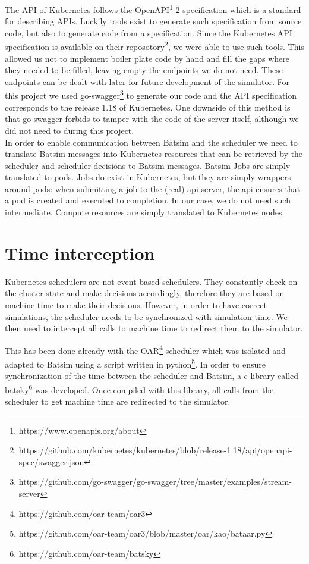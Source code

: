The API of Kubernetes follows the
OpenAPI\footnote{https://www.openapis.org/about} 2 specification which is a
standard for describing APIs. Luckily tools exist to generate such
specification from source code, but also to generate code from a specification.
Since the Kubernetes API specification is available on their
reposotory\footnote{https://github.com/kubernetes/kubernetes/blob/release-1.18/api/openapi-spec/swagger.json},
we were able to use such tools. This allowed us not to implement boiler plate
code by hand and fill the gaps where they needed to be filled, leaving empty
the endpoints we do not need. These endpoints can be dealt with later for
future development of the simulator. For this project we used
go-swagger\footnote{https://github.com/go-swagger/go-swagger/tree/master/examples/stream-server}
to generate our code and the API specification corresponds to the release 1.18
of Kubernetes. One downside of this method is that go-swagger forbids to tamper
with the code of the server itself, although we did not need to during this
project.\\

In order to enable communication between Batsim and the scheduler we need to
translate Batsim messages into Kubernetes resources that can be retrieved by
the scheduler and scheduler decisions to Batsim messages. Batsim Jobs are
simply translated to pods. Jobs do exist in Kubernetes, but they are simply
wrappers around pods: when submitting a job to the (real) api-server, the api
ensures that a pod is created and executed to completion. In our case, we do
not need such intermediate. Compute resources are simply translated to
Kubernetes nodes.

\section{Time interception} \label{sec:time-hijack}

Kubernetes schedulers are not event based schedulers. They constantly check on
the cluster state and make decisions accordingly, therefore they are based on
machine time to make their decisions. However, in order to have correct
simulations, the scheduler needs to be synchronized with simulation time. We
then need to intercept all calls to machine time to redirect them to the
simulator.

This has been done already with the
OAR\footnote{https://github.com/oar-team/oar3} scheduler which was isolated and
adapted to Batsim using a script written in
python\footnote{https://github.com/oar-team/oar3/blob/master/oar/kao/bataar.py}.
In order to ensure synchronization of the time between the scheduler and
Batsim, a c library called batsky\footnote{https://github.com/oar-team/batsky}
was developed. Once compiled with this library, all calls from the scheduler to
get machine time are redirected to the simulator.

